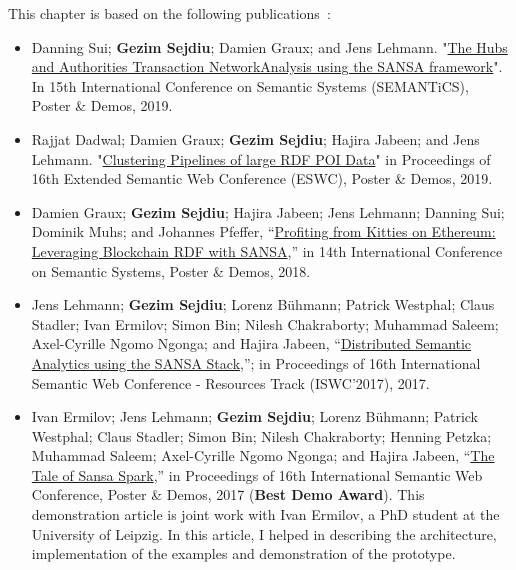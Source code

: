 This chapter is based on the following publications~\cite{lehmann-2017-sansa-iswc}:
\begin{itemize}

    \item Danning Sui; \textbf{Gezim Sejdiu}; Damien Graux; and Jens Lehmann. "\href{https://gezimsejdiu.github.io/publications/sansa-hubs-and-authorities-transaction-semantics19-poster.pdf}{The Hubs and Authorities Transaction NetworkAnalysis using the SANSA framework}".  In 15th International Conference on Semantic Systems (SEMANTiCS), Poster \& Demos, 2019.
   
    \item Rajjat Dadwal; Damien Graux; \textbf{Gezim Sejdiu}; Hajira Jabeen; and Jens Lehmann. "\href{https://gezimsejdiu.github.io/publications/piping-clustering-eswc19-poster.pdf}{Clustering Pipelines of large RDF POI Data}" in Proceedings of 16th Extended Semantic Web Conference (ESWC), Poster \& Demos, 2019.
   
    \item Damien Graux; \textbf{Gezim Sejdiu}; Hajira Jabeen; Jens Lehmann; Danning Sui; Dominik Muhs; and Johannes Pfeffer, “\href{http://jens-lehmann.org/files/2018/semantics_ethereum_pd.pdf}{Profiting from Kitties on Ethereum: Leveraging Blockchain RDF with SANSA},” in 14th International Conference on Semantic Systems, Poster \& Demos, 2018.
  
    \item Jens Lehmann; \textbf{Gezim Sejdiu}; Lorenz Bühmann; Patrick Westphal; Claus Stadler; Ivan Ermilov; Simon Bin; Nilesh Chakraborty; Muhammad Saleem; Axel-Cyrille Ngomo Ngonga; and Hajira Jabeen, “\href{http://svn.aksw.org/papers/2017/ISWC_SANSA_SoftwareFramework/public.pdf}{Distributed Semantic Analytics using the SANSA Stack},”; in Proceedings of 16th International Semantic Web Conference - Resources Track (ISWC’2017), 2017.

    \item Ivan Ermilov; Jens Lehmann; \textbf{Gezim Sejdiu}; Lorenz Bühmann; Patrick Westphal; Claus Stadler; Simon Bin; Nilesh Chakraborty; Henning Petzka; Muhammad Saleem; Axel-Cyrille Ngomo Ngonga; and Hajira Jabeen, “\href{http://jens-lehmann.org/files/2017/iswc_pd_sansa.pdf}{The Tale of Sansa Spark},” in Proceedings of 16th International Semantic Web Conference, Poster \& Demos, 2017 ({\color{darkred}\textbf{Best Demo Award}}).
    This demonstration article is joint work with Ivan Ermilov, a PhD student at the University of Leipzig. 
    In this article, I helped in describing the architecture, implementation of the examples and demonstration of the prototype.


\end{itemize}
